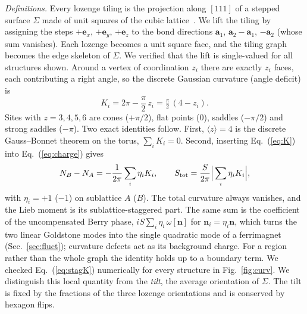 \documentclass[prb,twocolumn,amsmath,amssymb,floatfix]{revtex4-2}
\begin{document}
\emph{Definitions.} Every lozenge tiling is the projection along $[111]$ of a stepped surface $\Sigma$ made of unit squares of the cubic lattice~\cite{Kenyon2006}. We lift the tiling by assigning the steps $+\mathbf e_x$, $+\mathbf e_y$, $+\mathbf e_z$ to the bond directions $\mathbf a_1$, $\mathbf a_2-\mathbf a_1$, $-\mathbf a_2$ (whose sum vanishes). Each lozenge becomes a unit square face, and the tiling graph becomes the edge skeleton of $\Sigma$. We verified that the lift is single-valued for all structures shown. Around a vertex of coordination $z_i$ there are exactly $z_i$ faces, each contributing a right angle, so the discrete Gaussian curvature (angle deficit) is
\begin{equation}
K_i=2\pi-\frac{\pi}{2}\,z_i=\tfrac{\pi}{2}\,(4-z_i).
\label{eq:K}
\end{equation}
Sites with $z=3,4,5,6$ are cones ($+\pi/2$), flat points ($0$), saddles ($-\pi/2$) and strong saddles ($-\pi$). Two exact identities follow. First, $\langle z\rangle=4$ is the discrete Gauss--Bonnet theorem on the torus, $\sum_iK_i=0$. Second, inserting Eq.~(\ref{eq:K}) into Eq.~(\ref{eq:charge}) gives
\begin{equation}
N_B-N_A=-\frac{1}{2\pi}\sum_i\eta_iK_i,\qquad S_{\rm tot}=\frac{S}{2\pi}\Big|\sum_i\eta_iK_i\Big| ,
\label{eq:stagK}
\end{equation}
with $\eta_i=+1$ ($-1$) on sublattice $A$ ($B$). The total curvature always vanishes, and the Lieb moment is its sublattice-staggered part. The same sum is the coefficient of the uncompensated Berry phase, $iS\sum_i\eta_i\,\omega[\mathbf n]$ for $\mathbf n_i=\eta_i\mathbf n$, which turns the two linear Goldstone modes into the single quadratic mode of a ferrimagnet (Sec.~\ref{sec:fluct}); curvature defects act as its background charge. For a region rather than the whole graph the identity holds up to a boundary term. We checked Eq.~(\ref{eq:stagK}) numerically for every structure in Fig.~\ref{fig:curv}. We distinguish this local quantity from the \emph{tilt}, the average orientation of $\Sigma$. The tilt is fixed by the fractions of the three lozenge orientations and is conserved by hexagon flips.
\end{document}
